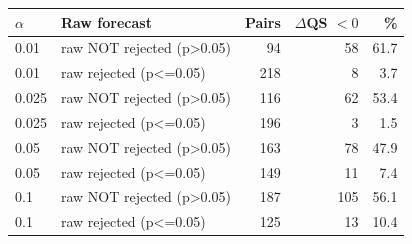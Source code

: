 \begin{tabular}{llrrr}
\toprule
$\alpha$ & Raw forecast & Pairs & $\Delta$QS $<0$ & \% \\
\midrule
0.01 & raw NOT rejected (p>0.05) & 94 & 58 & 61.7 \\
0.01 & raw rejected (p<=0.05) & 218 & 8 & 3.7 \\
0.025 & raw NOT rejected (p>0.05) & 116 & 62 & 53.4 \\
0.025 & raw rejected (p<=0.05) & 196 & 3 & 1.5 \\
0.05 & raw NOT rejected (p>0.05) & 163 & 78 & 47.9 \\
0.05 & raw rejected (p<=0.05) & 149 & 11 & 7.4 \\
0.1 & raw NOT rejected (p>0.05) & 187 & 105 & 56.1 \\
0.1 & raw rejected (p<=0.05) & 125 & 13 & 10.4 \\
\bottomrule
\end{tabular}
